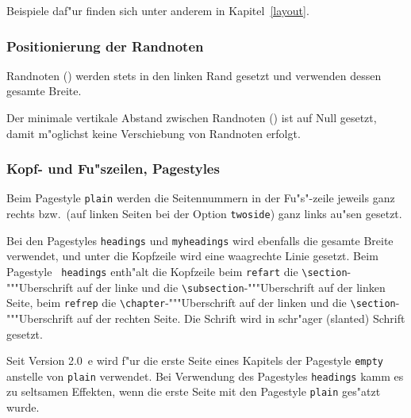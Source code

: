Beispiele daf"ur finden sich unter anderem in Kapitel~\ref{layout}.

\subsubsection{Positionierung der Randnoten}

Randnoten () werden stets in den linken Rand gesetzt
und verwenden dessen gesamte Breite.

Der minimale vertikale Abstand zwischen Randnoten ()
ist auf Null gesetzt, damit m"oglichst keine Verschiebung von Randnoten
erfolgt.


\subsubsection{Kopf- und Fu"szeilen, Pagestyles} \label{pagestyle}

Beim Pagestyle \texttt{plain} werden die Seitennummern in der
Fu"s"-zeile jeweils ganz rechts bzw.\ (auf linken Seiten bei der Option
\texttt{twoside}) ganz links au"sen gesetzt.

  Bei den Pagestyles \texttt{headings}
und \texttt{myheadings} wird ebenfalls die gesamte Breite verwendet, und
unter die Kopfzeile wird eine waagrechte Linie gesetzt. Beim Pagestyle
\texttt{ headings} enth"alt die Kopfzeile beim \texttt{refart} die
\verb|\section|-"""Uberschrift auf der linke und die
\verb|\subsection|-"""Uberschrift auf der linken Seite, beim
\texttt{refrep} die \verb|\chapter|-"""Uberschrift auf der linken und
die \verb|\section|-"""Uberschrift auf der rechten Seite.  Die Schrift
wird in schr"ager (slanted) Schrift gesetzt.

Seit Version 2.0~e wird f"ur die erste Seite eines Kapitels der
Pagestyle \texttt{empty} anstelle von \texttt{plain} verwendet. Bei
Verwendung des Pagestyles \texttt{headings} kamm es zu seltsamen
Effekten, wenn die erste Seite mit den Pagestyle \texttt{plain} ges"atzt
wurde.

